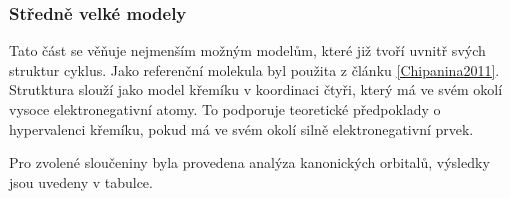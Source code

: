 \documentclass[
  digital, %
  table,   %
  lof,     %
  lot,     %
]{fithesis3}
\begin{document}
\subsubsection{Středně velké modely}
Tato část se věňuje nejmenším možným modelům, které již tvoří uvnitř svých struktur cyklus. Jako referenční molekula byl použita  z článku \ref{Chipanina2011}. Strutktura  slouží jako model křemíku v koordinaci čtyři, který má ve svém okolí vysoce elektronegativní atomy. To podporuje teoretické předpoklady o hypervalenci křemíku, pokud má ve svém okolí silně elektronegativní prvek.
\begin{figure}
\begin{center}
\caption{}
\label{obr_h4sio4_vysledky_I}
\end{center}
\end{figure}
Pro zvolené sloučeniny byla provedena analýza kanonických orbitalů, výsledky jsou uvedeny v tabulce.
\end{document}
